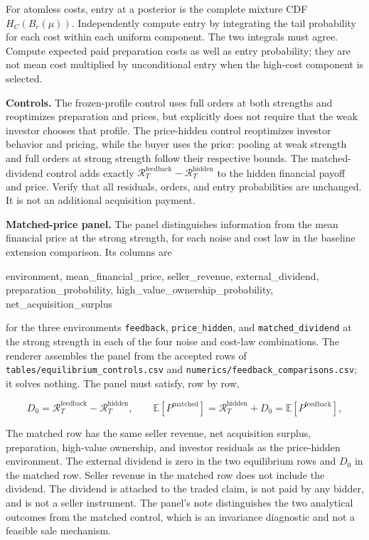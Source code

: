\documentclass[
  11pt,
]{article}
\newenvironment{Shaded}{}{}
\newcommand{\NormalTok}[1]{#1}
\begin{document}
For atomless costs, entry at a posterior is the complete mixture CDF
\(H_C(B_r(\mu))\). Independently compute entry by integrating the tail
probability for each cost within each uniform component. The two
integrals must agree. Compute expected paid preparation costs as well as
entry probability; they are not mean cost multiplied by unconditional
entry when the high-cost component is selected.

\textbf{Controls.} The frozen-profile control uses full orders at both
strengths and reoptimizes preparation and prices, but explicitly does
not require that the weak investor chooses that profile. The
price-hidden control reoptimizes investor behavior and pricing, while
the buyer uses the prior: pooling at weak strength and full orders at
strong strength follow their respective bounds. The matched-dividend
control adds exactly
\(\mathcal R_T^{\mathrm{feedback}}-\mathcal R_T^{\mathrm{hidden}}\) to
the hidden financial payoff and price. Verify that all residuals,
orders, and entry probabilities are unchanged. It is not an additional
acquisition payment.

\textbf{Matched-price panel.} The panel distinguishes information from
the mean financial price at the strong strength, for each noise and cost
law in the baseline extension comparison. Its columns are

\begin{Shaded}
\begin{Highlighting}[]
\NormalTok{environment, mean\_financial\_price, seller\_revenue, external\_dividend,}
\NormalTok{preparation\_probability, high\_value\_ownership\_probability, net\_acquisition\_surplus}
\end{Highlighting}
\end{Shaded}

for the three environments \texttt{feedback}, \texttt{price\_hidden},
and \texttt{matched\_dividend} at the strong strength in each of the
four noise and cost-law combinations. The renderer assembles the panel
from the accepted rows of \texttt{tables/equilibrium\_controls.csv} and
\texttt{numerics/feedback\_comparisons.csv}; it solves nothing. The
panel must satisfy, row by row,

\[
D_0=\mathcal R_T^{\mathrm{feedback}}-\mathcal R_T^{\mathrm{hidden}},\qquad
\mathbb E[P^{\mathrm{matched}}]=\mathcal R_T^{\mathrm{hidden}}+D_0=\mathbb E[P^{\mathrm{feedback}}],
\]

The matched row has the same seller revenue, net acquisition surplus,
preparation, high-value ownership, and investor residuals as the
price-hidden environment. The external dividend is zero in the two
equilibrium rows and \(D_0\) in the matched row. Seller revenue in the
matched row does not include the dividend. The dividend is attached to
the traded claim, is not paid by any bidder, and is not a seller
instrument. The panel's note distinguishes the two analytical outcomes
from the matched control, which is an invariance diagnostic and not a
feasible sale mechanism.
\end{document}
